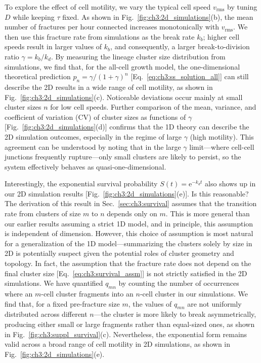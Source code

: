 To explore the effect of cell motility, we vary the typical cell speed $v_\textrm{rms}$ by tuning $D$ while keeping $\tau$ fixed. As shown in Fig.~\ref{fig:ch3:2d_simulations}(b), the mean number of fractures per hour connected increases monotonically with $v_\textrm{rms}$. We then use this fracture rate from simulations as the break rate $k_b$; higher cell speeds result in larger values of $k_b$, and consequently, a larger break-to-division ratio $\gamma=k_b/k_d$. By measuring the lineage cluster size distribution from simulations, we find that, for the all-cell growth model, the one-dimensional theoretical prediction $p_n=\gamma/(1+\gamma)^n$ [Eq.~\eqref{eq:ch3:ss_solution_all}] can still describe the 2D results in a wide range of cell motility, as shown in Fig.~\ref{fig:ch3:2d_simulations}(c). Noticeable deviations occur mainly at small cluster sizes $n$ for low cell speeds. Further comparison of the mean, variance, and coefficient of variation (CV) of cluster sizes as functions of $\gamma$ [Fig.~\ref{fig:ch3:2d_simulations}(d)] confirms that the 1D theory can describe the 2D simulation outcomes, especially in the regime of large $\gamma$ (high motility). This agreement can be understood by noting that in the large $\gamma$ limit---where cell-cell junctions frequently rupture---only small clusters are likely to persist, so the system effectively behaves as quasi-one-dimensional.

Interestingly, the exponential survival probability $S(t)=\mathrm{e}^{-k_d t}$ also shows up in our 2D simulation results [Fig.~\ref{fig:ch3:2d_simulations}(e)]. Is this reasonable? The derivation of this result in Sec.~\ref{sec:ch3:survival} assumes that the transition rate from clusters of size $m$ to $n$ depends only on $m$. This is more general than our earlier results assuming a strict 1D model, and in principle, this assumption is independent of dimension. However, this choice of assumption is most natural for a generalization of the 1D model---summarizing the clusters solely by size in 2D is potentially suspect given the potential roles of cluster geometry and topology. In fact, the assumption that the fracture rate does not depend on the final cluster size [Eq.~\eqref{eq:ch3:survival_assm}] is not strictly satisfied in the 2D simulations. We have quantified $q_{mn}$ by counting the number of occurrences where an $m$-cell cluster fragments into an $n$-cell cluster in our simulations. We find that, for a fixed pre-fracture size $m$, the values of $q_{mn}$ are not uniformly distributed across different $n$---the cluster is more likely to break asymmetrically, producing either small or large fragments rather than equal-sized ones, as shown in Fig.~\ref{fig:ch3:suppl_survival}(c). Nevertheless, the exponential form remains valid across a broad range of cell motility in 2D simulations, as shown in Fig.~\ref{fig:ch3:2d_simulations}(e).

